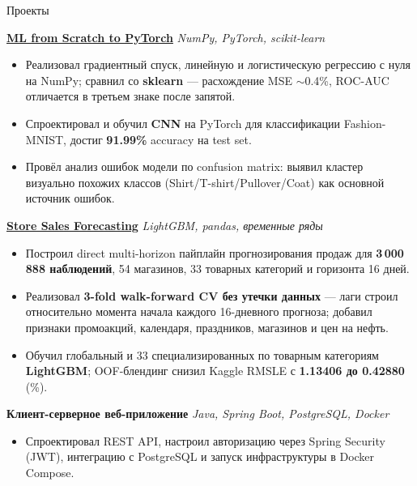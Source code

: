 \documentclass{resume} %
\begin{document}
\begin{rSection}{Проекты}

\item \textbf{\href{https://github.com/Antichnoste/ml-from-scratch-to-pytorch}{ML from Scratch to PyTorch}} \hfill \textit{NumPy, PyTorch, scikit-learn}
\begin{itemize}
    \itemsep -3pt {}
    \item Реализовал градиентный спуск, линейную и логистическую регрессию с нуля на NumPy; сравнил со \textbf{sklearn} — расхождение MSE $\sim$0.4\%, ROC-AUC отличается в третьем знаке после запятой.
    \item Спроектировал и обучил \textbf{CNN} на PyTorch для классификации Fashion-MNIST, достиг \textbf{91.99\%} accuracy на test set.
    \item Провёл анализ ошибок модели по confusion matrix: выявил кластер визуально похожих классов (Shirt/\allowbreak T-shirt/\allowbreak Pullover/\allowbreak Coat) как основной источник ошибок.
\end{itemize}

\item \textbf{\href{https://github.com/Antichnoste/store-sales-forecasting}{Store Sales Forecasting}} \hfill \textit{LightGBM, pandas, временные ряды}
\begin{itemize}
    \itemsep -3pt {}
    \item Построил direct multi-horizon пайплайн прогнозирования продаж для \textbf{3\,000\,888 наблюдений}, 54 магазинов, 33 товарных категорий и горизонта 16 дней.
    \item Реализовал \textbf{3-fold walk-forward CV без утечки данных} — лаги строил относительно момента начала каждого 16-дневного прогноза; добавил признаки промоакций, календаря, праздников, магазинов и цен на нефть.
    \item Обучил глобальный и 33 специализированных по товарным категориям \textbf{LightGBM}; OOF-блендинг снизил Kaggle RMSLE с \textbf{1.13406 до 0.42880} (\%).
\end{itemize}

\item \textbf{Клиент-серверное веб-приложение} \hfill \textit{Java, Spring Boot, PostgreSQL, Docker}
\begin{itemize}
    \itemsep -3pt {}
    \item Спроектировал REST API, настроил авторизацию через Spring Security (JWT), интеграцию с PostgreSQL и запуск инфраструктуры в Docker Compose.
\end{itemize}

\end{rSection} 
\end{document}

